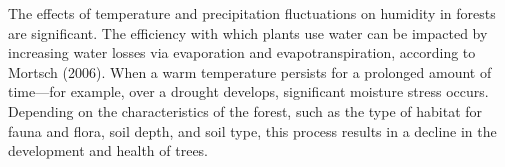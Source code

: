 The effects of temperature and precipitation fluctuations on humidity in forests are significant. The efficiency with which plants use water can be impacted by increasing water losses via evaporation and evapotranspiration, according to Mortsch (2006). When a warm temperature persists for a prolonged amount of time—for example, over a drought develops, significant moisture stress occurs. Depending on the characteristics of the forest, such as the type of habitat for fauna and flora, soil depth, and soil type, this process results in a decline in the development and health of trees.





